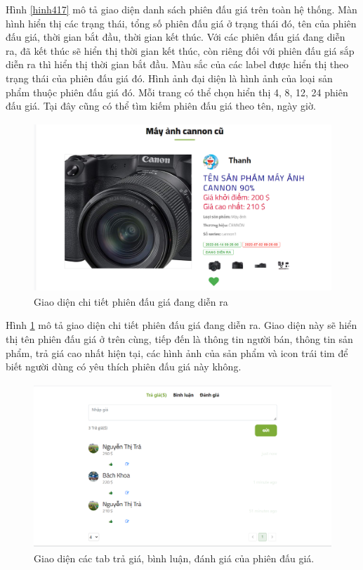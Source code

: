 \documentclass{article}
\begin{document}
Hình \ref{hinh417} mô tả giao diện danh sách phiên đấu giá trên toàn hệ thống. Màn hình hiển thị các trạng thái, tổng số phiên đấu giá ở trạng thái đó, tên của phiên đấu giá, thời gian bắt đầu, thời gian kết thúc. Với các phiên đấu giá đang diễn ra, đã kết thúc sẽ hiển thị thời gian kết thúc, còn riêng đối với phiên đấu giá sắp diễn ra thì hiển thị thời gian bắt đầu. Màu sắc của các label được hiển thị theo trạng thái của phiên đấu giá đó. Hình ảnh đại diện là hình ảnh của loại sản phẩm thuộc phiên đấu giá đó. Mỗi trang có thể chọn hiển thị 4, 8, 12, 24 phiên đấu giá. Tại đây cũng có thể tìm kiếm phiên đấu giá theo tên, ngày giờ. 
\begin{figure}[H]
    \centering
    \includegraphics[width=11.4cm,height=6.36cm]{images/auctionactive.png}
    \caption{Giao diện chi tiết phiên đấu giá đang diễn ra}
    \label{hinh418}
\end{figure}
Hình \ref{hinh418} mô tả giao diện chi tiết phiên đấu giá đang diễn ra. Giao diện này sẽ hiển thị tên phiên đấu giá ở trên cùng, tiếp đến là thông tin người bán, thông tin sản phẩm, trả giá cao nhất hiện tại, các hình ảnh của sản phẩm và icon trái tim để biết người dùng có yêu thích phiên đấu giá này không.
\begin{figure}[H]
    \centering
    \includegraphics[width=11.4cm,height=6.20cm]{images/commentbid.png}
    \caption{Giao diện các tab trả giá, bình luận, đánh giá của phiên đấu giá.}
    \label{hinh419}
\end{figure}
\end{document}
